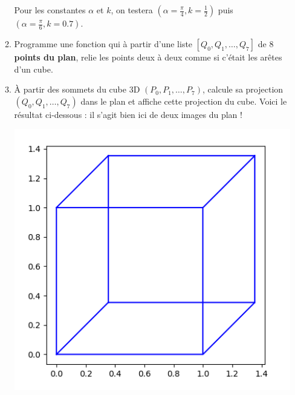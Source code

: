 \documentclass[11pt,class=report,crop=false]{standalone}
\begin{document}
\begin{activite}[Perspective]
\begin{enumerate}
\begin{enumerate}
		Pour les constantes $\alpha$ et $k$, on testera $(\alpha=\frac\pi4,k=\frac12)$ puis $(\alpha=\frac\pi6,k=0.7)$.
	
		\item Programme une fonction  qui à partir d'une liste $[Q_0,Q_1,\ldots,Q_7]$
		de $8$ \textbf{points du plan}, relie les points deux à deux comme si c'était les arêtes d'un cube.
	
		\item \`A partir des sommets du cube 3D $(P_0,P_1,\ldots,P_7)$, calcule sa projection $(Q_0,Q_1,\ldots,Q_7)$ dans le plan et affiche cette projection du cube. Voici le résultat ci-dessous : il s'agit bien ici de deux images du plan !
		
		\begin{center}
		\begin{minipage}{0.45\textwidth}
		\begin{center}
			\includegraphics[scale=\myscale,scale=0.4]{ecran-perspective-2}
		

\end{center}
\end{minipage}
\end{center}
\end{enumerate}
\end{enumerate}
\end{activite}
\end{document}
